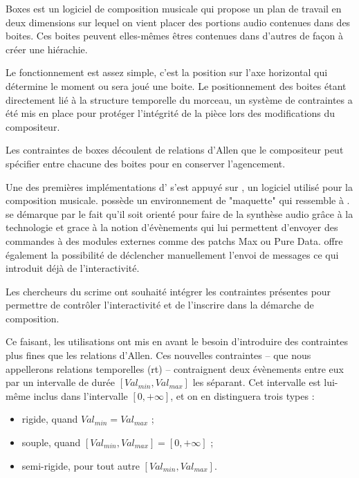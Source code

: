 Boxes\cite{Beurive2000boxes} est un logiciel de composition musicale qui propose un plan de travail en deux dimensions  sur lequel on vient placer des portions audio contenues dans des boites. Ces boites peuvent elles-mêmes êtres contenues dans d'autres de façon à créer une hiérachie.


Le fonctionnement est assez simple, c'est la position sur l'axe horizontal qui détermine le moment ou sera joué une boite. Le positionnement des boites étant directement lié à la structure temporelle du morceau, un système de contraintes a été mis en place pour protéger l'intégrité de la pièce lors des modifications du compositeur.

Les contraintes de boxes découlent de relations d'Allen  que le compositeur peut spécifier entre chacune des boites pour en conserver l'agencement.


Une des premières implémentations d'\iscore{} s'est appuyé sur \openmusic{}, un logiciel utilisé pour la composition musicale. \openmusic{} possède un environnement de "maquette" qui ressemble à \boxes{}. \openmusic{} se démarque par le fait qu'il soit orienté pour faire de la synthèse audio grâce à la technologie \osc{} et grace à la notion d'évènements qui lui permettent d'envoyer des commandes à des modules externes comme des patchs Max ou Pure Data. \openmusic{} offre également la possibilité de déclencher manuellement l'envoi de messages \osc{} ce qui introduit déjà de l'interactivité.

Les chercheurs du \acrshort{scrime}\cite{Scrime2015} ont souhaité intégrer les contraintes présentes \boxes{}\cite{allombert:hal-00353628} pour permettre de contrôler l'interactivité et de l'inscrire dans la démarche de composition.

Ce faisant, les utilisations ont mis en avant le besoin d'introduire des contraintes plus fines que les relations d'Allen. Ces nouvelles contraintes -- que nous appellerons relations temporelles (\acrshort{rt}) -- contraignent deux évènements entre eux par un intervalle de durée $[Val_{min}, Val_{max}]$ les séparant. Cet intervalle est lui-même inclus dans l'intervalle $[0,+\infty]$, et on en distinguera trois types :

\begin{itemize}
\item rigide, quand $Val_{min} = Val_{max}$ ;
\item souple, quand $[Val_{min}, Val_{max}] = [0,+\infty]$ ;
\item semi-rigide, pour tout autre $[Val_{min}, Val_{max}]$.
\end{itemize}

